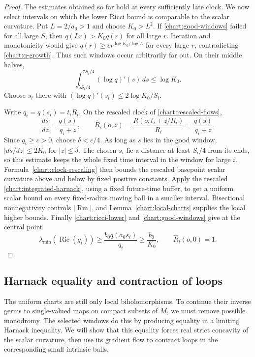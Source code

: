 \documentclass[11pt]{article}
\theoremstyle{definition}
\theoremstyle{remark}
\DeclareMathOperator{\Ric}{Ric}
\DeclareMathOperator{\Rm}{Rm}
\numberwithin{equation}{section}
\begin{document}
\begin{proof}
The estimates obtained so far hold at every sufficiently late clock.
We now select intervals on which the lower Ricci bound is comparable
to the scalar curvature.  Put $L=2/a_0>1$ and choose $K_0>L^2$.  If
\eqref{chart:good-windows} failed for all large $S$, then
$q(Lr)>K_0q(r)$ for all large $r$.  Iteration and monotonicity
would give $q(r)\ge cr^{\log K_0/\log L}$ for every large $r$,
contradicting \eqref{chart:q-growth}.  Thus such windows occur
arbitrarily far out.  On their middle halves,
\[
 \int_{5S_i/4}^{7S_i/4}(\log q)'(s)\,ds\le\log K_0.
\]
Choose $s_i$ there with
$(\log q)'(s_i)\le2\log K_0/S_i$.

Write $q_i=q(s_i)=t_iR_i$.  On the rescaled clock of
\eqref{chart:rescaled-flows},
\begin{equation}\label{chart:clock-rescaling}
 \frac{ds}{dz}=\frac{q(s)}{q_i+z},\qquad
 \widehat R_i(o,z)=\frac{R(o,t_i+z/R_i)}{R_i}
                 =\frac{q(s)}{q_i+z}.
\end{equation}
Since $q_i\ge c>0$, choose $\delta<c/4$.  As long as $s$ lies
in the good window, $|ds/dz|\le2K_0$ for $|z|\le\delta$.
The chosen $s_i$ lie a distance at least $S_i/4$ from its ends,
so this estimate keeps the whole fixed time interval in the
window for large $i$.  Formula~\eqref{chart:clock-rescaling}
then bounds the rescaled basepoint scalar curvature above and
below by fixed positive constants.  Apply the rescaled
\eqref{chart:integrated-harnack}, using a fixed future-time
buffer, to get a uniform scalar bound on every fixed-radius
moving ball in a smaller interval.  Bisectional nonnegativity
controls $|\Rm|$, and Lemma~\ref{chart:local-charts} supplies
the local higher bounds.  Finally
\eqref{chart:ricci-lower} and \eqref{chart:good-windows} give
at the central point
\[
 \lambda_{\min}(\Ric(g_i))
 \ge\frac{b_0q(a_0s_i)}{q_i}\ge\frac{b_0}{K_0},
 \qquad \widehat R_i(o,0)=1.
\]
\end{proof}

\subsection{Harnack equality and contraction of loops}

The uniform charts are still only local biholomorphisms.  To continue
their inverse germs to single-valued maps on compact subsets of $M$,
we must remove possible monodromy.  The selected windows do this by
producing equality in a limiting Harnack inequality.  We will show
that this equality forces real strict concavity of the scalar
curvature, then use its gradient flow to contract loops in the
corresponding small intrinsic balls.
\end{document}
